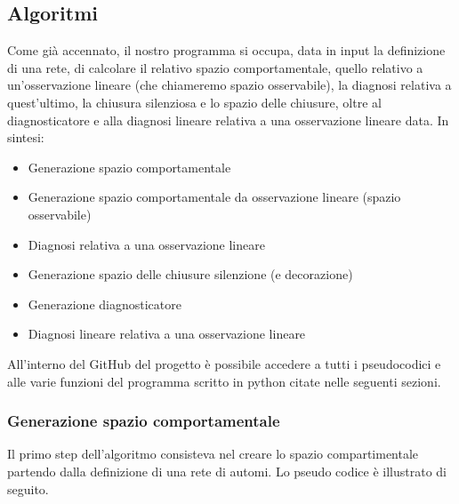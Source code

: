\subsection{Algoritmi}
Come già accennato, il nostro programma si occupa, data in input la definizione di una rete, di calcolare il relativo spazio comportamentale, quello relativo a un'osservazione lineare (che chiameremo spazio osservabile), la diagnosi relativa a quest'ultimo, la chiusura silenziosa e lo spazio delle chiusure, oltre al diagnosticatore e alla diagnosi lineare relativa a una osservazione lineare data.
In sintesi:
\begin{itemize}
    \item Generazione spazio comportamentale
    \item Generazione spazio comportamentale da osservazione lineare (spazio osservabile)
    \item Diagnosi relativa a una osservazione lineare
    \item Generazione spazio delle chiusure silenzione (e decorazione)
    \item Generazione diagnosticatore
    \item Diagnosi lineare relativa a una osservazione lineare
\end{itemize}

All'interno del GitHub del progetto è possibile accedere a tutti i pseudocodici e alle varie funzioni del programma scritto in python citate nelle seguenti sezioni.
\subsubsection{Generazione spazio comportamentale}
Il primo step dell’algoritmo consisteva nel creare lo spazio compartimentale partendo dalla definizione di una rete di automi. 
Lo pseudo codice è illustrato di seguito.

